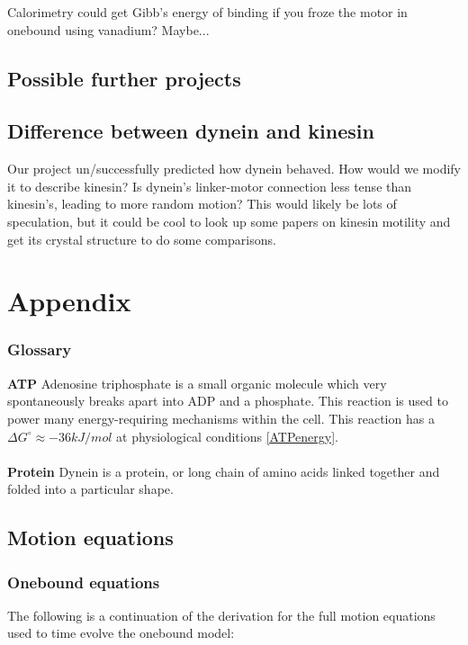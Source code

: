 \documentclass[10pt]{article} %
\begin{document}
Calorimetry could get Gibb's energy of binding if you froze the motor in onebound using
vanadium? Maybe...\\
\subsection{Possible further projects}
\subsection{Difference between dynein and kinesin}
Our project un/successfully predicted how dynein behaved. How would we modify it to describe kinesin?
Is dynein's linker-motor connection less tense than kinesin's, leading to more random motion? This
would likely be lots of speculation, but it could be cool to look up some papers on kinesin motility
and get its crystal structure to do some comparisons.




\section{Appendix}

\subsubsection{Glossary}
\textbf{ATP} Adenosine triphosphate is a small organic molecule which very spontaneously breaks apart into ADP and a phosphate. This reaction is used to power many energy-requiring mechanisms within the cell. This reaction has a $\Delta G^\circ \approx -36 kJ/mol$ at physiological conditions \ref{ATPenergy}.\\\\
\textbf{Protein} Dynein is a protein, or long chain of amino acids linked together and folded into a particular shape.\\

\subsection{Motion equations}

\subsubsection{Onebound equations}
\label{sec:ob-motion-equations}
The following is a continuation of the derivation for the full motion equations used to time evolve the onebound model:
\end{document}
